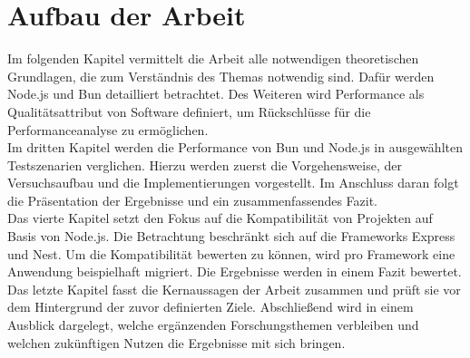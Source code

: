 \section{Aufbau der Arbeit} \label{sec:introduction-overview}
Im folgenden Kapitel vermittelt die Arbeit alle notwendigen theoretischen Grundlagen, die zum Verständnis des Themas notwendig sind. Dafür werden Node.js und Bun detailliert betrachtet. Des Weiteren wird Performance als Qualitätsattribut von Software definiert, um Rückschlüsse für die Performanceanalyse zu ermöglichen.\\

\noindent
Im dritten Kapitel werden die Performance von Bun und Node.js in ausgewählten Testszenarien verglichen. Hierzu werden zuerst die Vorgehensweise, der Versuchsaufbau und die Implementierungen vorgestellt. Im Anschluss daran folgt die Präsentation der Ergebnisse und ein zusammenfassendes Fazit.\\

\noindent
Das vierte Kapitel setzt den Fokus auf die Kompatibilität von Projekten auf Basis von Node.js. Die Betrachtung beschränkt sich auf die Frameworks Express und Nest. Um die Kompatibilität bewerten zu können, wird pro Framework eine Anwendung beispielhaft migriert. Die Ergebnisse werden in einem Fazit bewertet.\\

\noindent
Das letzte Kapitel fasst die Kernaussagen der Arbeit zusammen und prüft sie vor dem Hintergrund der zuvor definierten Ziele. Abschließend wird in einem Ausblick dargelegt, welche ergänzenden Forschungsthemen verbleiben und welchen zukünftigen Nutzen die Ergebnisse mit sich bringen.